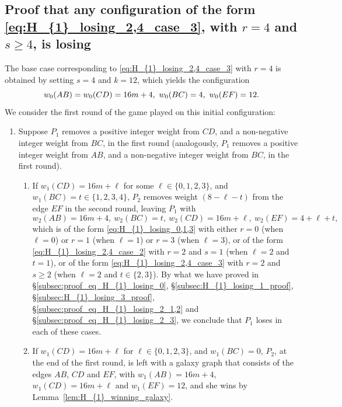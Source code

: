 \documentclass[11pt,reqno]{amsart}
\theoremstyle{definition}
\theoremstyle{definition}
\begin{document}
\subsection{Proof that any configuration of the form \eqref{eq:H_{1}_losing_2,4_case_3}, with $r=4$ and $s\geqslant 4$, is losing}\label{subsec:H_{1}_losing_4_7_proof}
The base case corresponding to \eqref{eq:H_{1}_losing_2,4_case_3} with $r=4$ is obtained by setting $s=4$ and $k=12$, which yields the configuration
\begin{equation}
w_{0}(AB)=w_{0}(CD)=16m+4,\ w_{0}(BC)=4,\ w_{0}(EF)=12.\label{eq:H_{1}_losing_4_7_base_case}
\end{equation}
We consider the first round of the game played on this initial configuration:
\begin{enumerate}
\item Suppose $P_{1}$ removes a positive integer weight from $CD$, and a non-negative integer weight from $BC$, in the first round (analogously, $P_{1}$ removes a positive integer weight from $AB$, and a non-negative integer weight from $BC$, in the first round).
\begin{enumerate}
\item If $w_{1}(CD)=16m+\ell$ for some $\ell \in \{0,1,2,3\}$, and $w_{1}(BC)=t\in\{1,2,3,4\}$, $P_{2}$ removes weight $(8-\ell-t)$ from the edge $EF$ in the second round, leaving $P_{1}$ with
\begin{equation}
w_{2}(AB)=16m+4,\ w_{2}(BC)=t,\ w_{2}(CD)=16m+\ell,\ w_{2}(EF)=4+\ell+t,\nonumber
\end{equation}
which is of the form \eqref{eq:H_{1}_losing_0,1,3} with either $r=0$ (when $\ell=0$) or $r=1$ (when $\ell=1$) or $r=3$ (when $\ell=3$), or of the form \eqref{eq:H_{1}_losing_2,4_case_2} with $r=2$ and $s=1$ (when $\ell=2$ and $t=1$), or of the form \eqref{eq:H_{1}_losing_2,4_case_3} with $r=2$ and $s\geqslant 2$ (when $\ell=2$ and $t\in\{2,3\}$). By what we have proved in \S\ref{subsec:proof_eq_H_{1}_losing_0}, \S\ref{subsec:H_{1}_losing_1_proof}, \S\ref{subsec:H_{1}_losing_3_proof}, \S\ref{subsec:proof_eq_H_{1}_losing_2_1,2} and \S\ref{subsec:proof_eq_H_{1}_losing_2_3}, we conclude that $P_{1}$ loses in each of these cases.

\item If $w_{1}(CD)=16m+\ell$ for $\ell \in \{0,1,2,3\}$, and $w_{1}(BC)=0$, $P_{2}$, at the end of the first round, is left with a galaxy graph that consists of the edges $AB$, $CD$ and $EF$, with $w_{1}(AB)=16m+4$, $w_{1}(CD)=16m+\ell$ and $w_{1}(EF)=12$, and she wins by Lemma~\ref{lem:H_{1}_winning_galaxy}.
\end{enumerate}


\end{enumerate}
\end{document}
